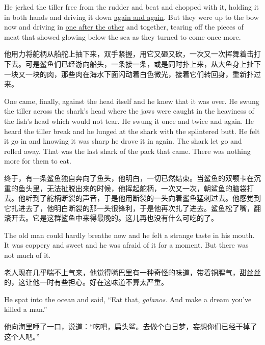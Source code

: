 \begin{paracol}{2}
\switchcolumn*

He jerked the tiller free from the rudder and beat and chopped with it,
holding it in both hands and driving it down \uline{again and again}. But they were
up to the bow now and driving in \uline{one after the other} and together,
\gls{tearing} off the pieces of meat that showed glowing below the sea as they
turned to come once more.

\switchcolumn

他用力将舵柄从船舵上抽下来，双手紧握，用它又砸又砍，一次又一次挥舞着击打下去。可是鲨鱼们已经游向船头，一条接一条，或是同时扑上来，从大鱼身上扯下一块又一块的肉，那些肉在海水下面闪动着白色微光，接着它们转回身，重新扑过来。

\switchcolumn*

One came, finally, against the head itself and he knew that it was over. He
swung the tiller across the shark's head where the jaws were caught in the
heaviness of the fish's head which would not \gls{tear}. He swung it once and
twice and again. He heard the tiller break and he \gls{lunged} at the shark
with the \gls{splintered} butt. He felt it go in and knowing it was sharp he
drove it in again. The shark let go and rolled away. That was the last shark
of the \gls{pack} that came. There was nothing more for them to eat.

\switchcolumn

终于，有一条鲨鱼独自奔向了鱼头，他明白，一切已然结束。当鲨鱼的双颚卡在沉重的鱼头里，无法扯脱出来的时候，他挥起舵柄，一次又一次，朝鲨鱼的脑袋打去。他听到了舵柄断裂的声音，于是他用断裂的一头向着鲨鱼猛刺过去。他感觉到它扎进去了，他明白断裂的那一头很锋利，于是他再次扎了进去。鲨鱼松了嘴，翻滚开去。它是这群鲨鱼中来得最晚的。这儿再也没有什么可吃的了。

\switchcolumn*

The old man could hardly breathe now and he felt a strange taste in his
mouth. It was \gls{coppery} and sweet and he was afraid of it for a moment.
But there was not much of it.

\switchcolumn

老人现在几乎喘不上气来，他觉得嘴巴里有一种奇怪的味道，带着铜腥气，甜丝丝的，这让他一时有些担心。好在这味道不算太严重。

\switchcolumn*

He \gls{spat} into the ocean and said, ``Eat that, \emph{galanos}. And make a dream
you've killed a man.''

\switchcolumn

他向海里唾了一口，说道：“吃吧，扁头鲨。去做个白日梦，妄想你们已经干掉了这个人吧。”


\end{paracol}
